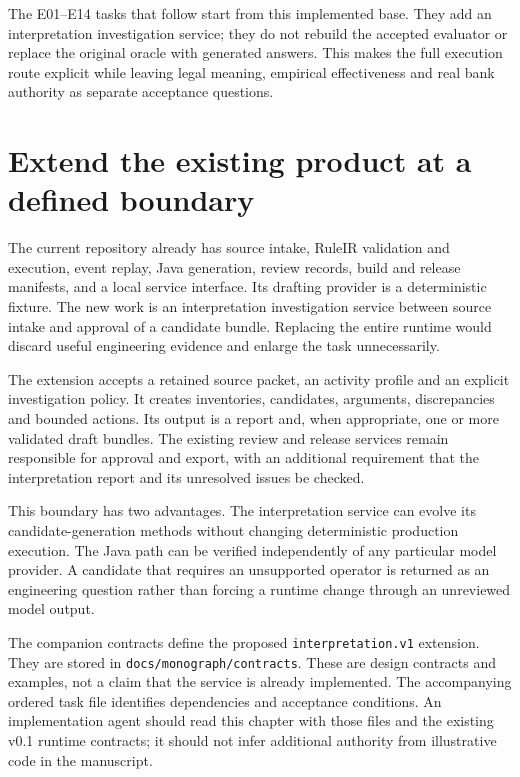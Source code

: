 \documentclass[12pt,a4paper,oneside,openany]{book}
\begin{document}
The E01--E14 tasks that follow start from this implemented base. They add an
interpretation investigation service; they do not rebuild the accepted evaluator
or replace the original oracle with generated answers. This makes the full
execution route explicit while leaving legal meaning, empirical effectiveness
and real bank authority as separate acceptance questions.


\section{Extend the existing product at a defined boundary}
\label{merge:M08:00}


The current repository already has source intake, RuleIR validation and execution,
event replay, Java generation, review records, build and release manifests, and a
local service interface. Its drafting provider is a deterministic fixture. The
new work is an interpretation investigation service between source intake and
approval of a candidate bundle. Replacing the entire runtime would discard useful
engineering evidence and enlarge the task unnecessarily.

The extension accepts a retained source packet, an activity profile and an
explicit investigation policy. It creates inventories, candidates, arguments,
discrepancies and bounded actions. Its output is a report and, when appropriate,
one or more validated draft bundles. The existing review and release services
remain responsible for approval and export, with an additional requirement that
the interpretation report and its unresolved issues be checked.

This boundary has two advantages. The interpretation service can evolve its
candidate-generation methods without changing deterministic production execution.
The Java path can be verified independently of any particular model provider.
A candidate that requires an unsupported operator is returned as an engineering
question rather than forcing a runtime change through an unreviewed model output.

The companion contracts define the proposed \texttt{interpretation.v1} extension.
They are stored in \texttt{docs/monograph/contracts}. These are design contracts
and examples, not
a claim that the service is already implemented. The accompanying ordered task file identifies dependencies and acceptance conditions. An
implementation agent should read this chapter with those files and the existing
v0.1 runtime contracts; it should not infer additional authority from illustrative
code in the manuscript.
\end{document}
